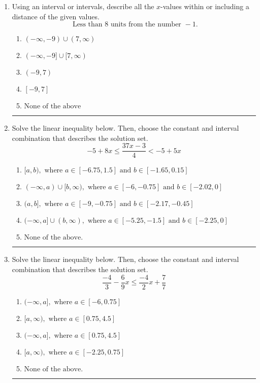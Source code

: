 \documentclass[14pt]{extbook}
\newcommand{\litem}[1]{\item#1\hspace*{-1cm}\rule{\textwidth}{0.4pt}}
\begin{document}
\begin{enumerate}
{\begin{enumerate}[label=\Alph*.]
\end{enumerate} }
\litem{
Using an interval or intervals, describe all the $x$-values within or including a distance of the given values.\[ \text{ Less than } 8 \text{ units from the number } -1. \]\begin{enumerate}[label=\Alph*.]
\item \( (-\infty, -9) \cup (7, \infty) \)
\item \( (-\infty, -9] \cup [7, \infty) \)
\item \( (-9, 7) \)
\item \( [-9, 7] \)
\item \( \text{None of the above} \)

\end{enumerate} }
\litem{
Solve the linear inequality below. Then, choose the constant and interval combination that describes the solution set.\[ -5 + 8 x \leq \frac{37 x - 3}{4} < -5 + 5 x \]\begin{enumerate}[label=\Alph*.]
\item \( [a, b), \text{ where } a \in [-6.75, 1.5] \text{ and } b \in [-1.65, 0.15] \)
\item \( (-\infty, a) \cup [b, \infty), \text{ where } a \in [-6, -0.75] \text{ and } b \in [-2.02, 0] \)
\item \( (a, b], \text{ where } a \in [-9, -0.75] \text{ and } b \in [-2.17, -0.45] \)
\item \( (-\infty, a] \cup (b, \infty), \text{ where } a \in [-5.25, -1.5] \text{ and } b \in [-2.25, 0] \)
\item \( \text{None of the above.} \)

\end{enumerate} }
\litem{
Solve the linear inequality below. Then, choose the constant and interval combination that describes the solution set.\[ \frac{-4}{3} - \frac{6}{9} x \leq \frac{-4}{2} x + \frac{7}{7} \]\begin{enumerate}[label=\Alph*.]
\item \( (-\infty, a], \text{ where } a \in [-6, 0.75] \)
\item \( [a, \infty), \text{ where } a \in [0.75, 4.5] \)
\item \( (-\infty, a], \text{ where } a \in [0.75, 4.5] \)
\item \( [a, \infty), \text{ where } a \in [-2.25, 0.75] \)
\item \( \text{None of the above}. \)


\end{enumerate}}
\end{enumerate}
\end{document}
